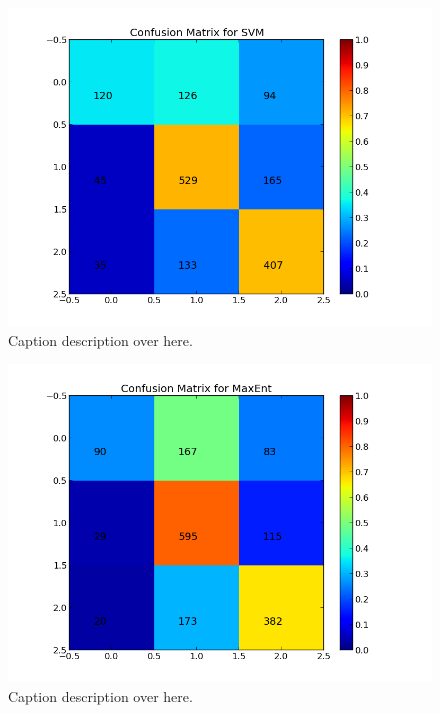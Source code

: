 \begin{minipage}[s]{\linewidth}
     \centering
     \begin{minipage}{0.45\linewidth}
          \begin{figure}[H]
               \includegraphics[width=\linewidth]{../img/plots/grid/confusion_matrix_SVM.png}
           \caption[Results overview across models]{Caption description over here.}
           \label{fig:confmat_svm}
          \end{figure}
     \end{minipage}
     \hspace{0.05\linewidth}
     \begin{minipage}{0.45\linewidth}
          \begin{figure}[H]
               \includegraphics[width=\linewidth]{../img/plots/grid/confusion_matrix_MaxEnt.png}
           \caption[Results overview across models]{Caption description over here.}
           \label{fig:confmat_maxent}
          \end{figure}
     \end{minipage} \\
 

\end{minipage}

